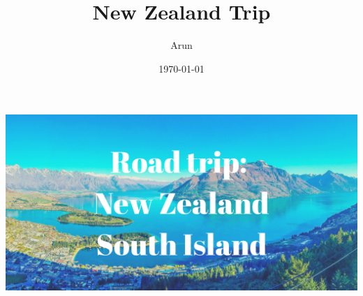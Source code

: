 \documentclass[12pt]{beamer}
\title{New Zealand Trip}
\author{Arun}
\date{\today}
\begin{document}
        \frame{\titlepage}
        \begin{frame}
            \begin{center}
                \includegraphics[width=1\textwidth]{images/road-trip.png}
            \end{center}
        \end{frame}
    
\end{document}
